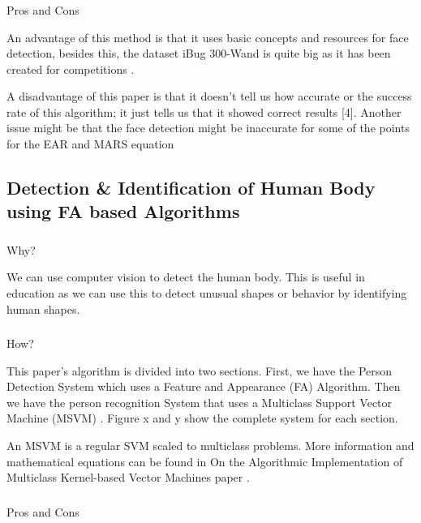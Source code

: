 \documentclass[conference]{IEEEtran}
\begin{document}
\subsubsection{}Pros and Cons 

An advantage of this method is that it uses basic concepts and resources for face detection, besides this, the dataset iBug 300-Wand is quite big as it has been created for competitions \cite{b6}.

A disadvantage of this paper is that it doesn’t tell us how accurate or the success rate of this algorithm; it just tells us that it showed correct results [4]. Another issue might be that the face detection might be inaccurate for some of the points for the EAR and MARS equation


\subsection{Detection \& Identification of Human Body using FA based Algorithms}

\subsubsection{}Why?

We can use computer vision to detect the human body. This is useful in education as we can use this to detect unusual shapes or behavior by identifying human shapes.

\subsubsection{}How? 

This paper’s algorithm is divided into two sections. First, we have the Person Detection System which uses a Feature and Appearance (FA) Algorithm. Then we have the person recognition System that uses a Multiclass Support Vector Machine (MSVM) \cite{b7}. Figure x and y show the complete system for each section.

An MSVM is a regular SVM scaled to multiclass problems. More information and mathematical equations can be found in On the Algorithmic Implementation of Multiclass Kernel-based Vector Machines paper \cite{b8}.

\subsubsection{}Pros and Cons 
\end{document}
